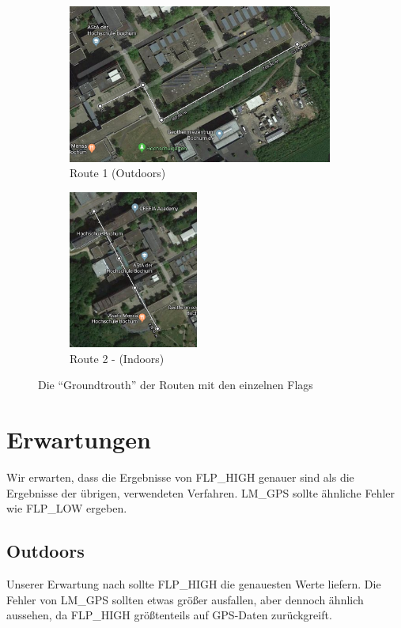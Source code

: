 \begin{figure}[h!]
	\centering
	\begin{subfigure}[b]{.64\textwidth}
		\centering
        \includegraphics[height=5.2cm]{route1}
        \caption{Route  1 (Outdoors)}
        \label{fig:route1}
    \end{subfigure}
    \begin{subfigure}[b]{.35\textwidth}
    	\centering
        \includegraphics[height=5.2cm]{route2}
        \caption{Route 2 - (Indoors)}
        \label{fig:route2}
    \end{subfigure}
    \caption{Die "`Groundtrouth"' der Routen mit den einzelnen Flags}
    \label{fig:routen}
\end{figure}

\section{Erwartungen}

Wir erwarten, dass die Ergebnisse von FLP\_HIGH genauer sind als die Ergebnisse der übrigen, verwendeten Verfahren. LM\_GPS sollte ähnliche Fehler wie FLP\_LOW ergeben. 

\subsection{Outdoors}

Unserer Erwartung nach sollte FLP\_HIGH die genauesten Werte liefern. Die Fehler von LM\_GPS sollten etwas größer ausfallen, aber dennoch ähnlich aussehen, da FLP\_HIGH größtenteils auf GPS-Daten zurückgreift. \\

